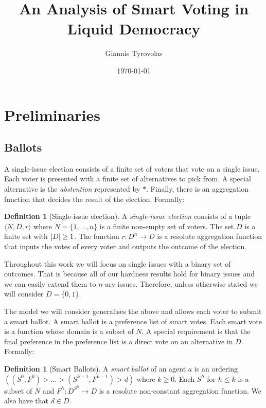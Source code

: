 \documentclass[11pt,a4paper, titlepage]{article}
\title{An Analysis of Smart Voting in Liquid Democracy}
\author{Giannis Tyrovolas}
\date{\today}
\DeclarePairedDelimiter\abs{\lvert}{\rvert}
\theoremstyle{definition}
\newtheorem{definition}[theorem]{Definition}
\begin{document}
\maketitle

\tableofcontents

\newpage

\section{Preliminaries}

\subsection{Ballots}


A single-issue election consists of a finite set of voters that vote on a single issue. 
Each voter is presented with a finite set of alternatives to pick from. 
A special alternative is the \emph{abstention} represented by $*$. 
Finally, there is an aggregation function that decides the result of the election. 
Formally:

\begin{definition}[Single-issue election]
    A \emph{single-issue election} consists of a tuple $\langle N, D, r\rangle $ where $N = \{1,..., n\} $ is a finite non-empty set of voters. The set $D$ is a finite set with $\abs{D} \geq 1$. The function $r \colon D^n \longrightarrow D$ is a resolute aggregation function that inputs the votes of every voter and outputs the outcome of the election.
\end{definition}

Throughout this work we will focus on single issues with a binary set of outcomes. 
That is because all of our hardness results hold for binary issues and we can easily extend them to $n$-ary issues. 
Therefore, unless otherwise stated we will consider $D = \{0, 1\}$.

The model we will consider generalises the above and allows each voter to submit a smart ballot. 
A smart ballot is a preference list of smart votes. 
Each smart vote is a function whose domain is a subset of $N$. 
A special requirement is that the final preference in the preference list is a direct vote on an alternative in $D$. 
Formally:

\begin{definition}[Smart Ballots]
    A \emph{smart ballot} of an agent $a$ is an ordering $( (S^0, F^0) > \ldots > (S^{k-1}, F^{k-1}) > d)$ where $k \geq 0$. Each $S^h$ for $h \leq k$ is a subset of $N$ and $F^h \colon D^{S^h} \longrightarrow D$ is a resolute non-constant aggregation function. We also have that $d \in D$.   
\end{definition}
\end{document}
